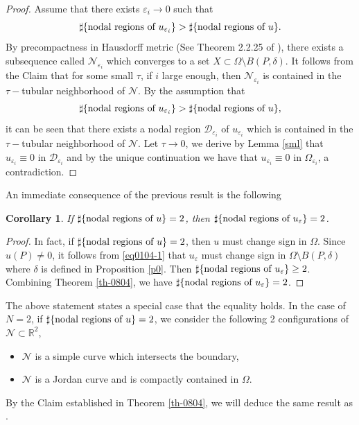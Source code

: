 \documentclass[11pt,reqno]{article}
\newtheorem{cor}[teo]{Corollary}
\numberwithin{equation}{section}
\newcommand\R{\mathbb R}
\newcommand\e\varepsilon
\renewcommand\O\Omega
\begin{document}
\begin{proof}
      Assume that there exists $\e_i\to 0$ such that
      $$
    \sharp\{\hbox{nodal regions of } u_{\e_i}\}> \sharp \{\hbox{nodal regions of } u\}.
    $$
     By precompactness in Hausdorff metric (See Theorem 2.2.25 of \cite{Henrot2018}), there exists a subsequence called $\mathcal{N}_{\e_i}$  which converges to a set $X\subset\O\setminus B(P,\delta)$. It follows from  the Claim  that  for some small $\tau$, if $i$ large enough,  then $\mathcal{N}_{\e_i}$ is contained in the $\tau-$tubular neighborhood of $\mathcal{N}$. By the assumption that  
     $$
    \sharp\{\hbox{nodal regions of } u_{\e_i}\}> \sharp \{\hbox{nodal regions of } u\},
    $$
    it can be seen that there exists a nodal region $\mathcal{D}_{\e_i}$ of $u_{\e_i}$  which is contained in the $\tau-$tubular neighborhood of $\mathcal{N}$. Let $\tau\to 0$, we derive by Lemma \ref{sml} that $u_{\e_i}\equiv 0$ in $\mathcal{D}_{\e_i}$ and by the unique continuation we have that $u_{\e_i}\equiv0$ in $\Omega_{\e_i}$, a contradiction.
   \end{proof}
    An immediate consequence of the previous result is the following
   \begin{cor}
 If $\sharp \{\hbox{nodal regions of } u\}=2$, then $\sharp \{\hbox{nodal regions of } u_\e\}= 2$.
   \end{cor}
    \begin{proof}
In fact,  if $\sharp \{\hbox{nodal regions of } u\}=2$, then $u$ must change sign in $\O$.  Since $u(P)\neq 0$, it follows from \eqref{eq0104-1} that $u_\e$ must change sign in $\O\setminus B(P,\delta)$ where $\delta$ is defined in Proposition \ref{p0}. Then $\sharp \{\hbox{nodal regions of } u_\e\}\ge 2$. Combining Theorem \ref{th-0804}, we have $\sharp \{\hbox{nodal regions of } u_\e\}= 2$.
   \end{proof}
   The above statement states a special case that the equality holds. In the case of $N=2$, if $\sharp \{\hbox{nodal regions of } u\}=2$, we consider the following 2 configurations of $\mathcal{N}\subset\R^2$,
   \begin{itemize}
       \item [(I)] $\mathcal{N}$ is a simple curve  which intersects the boundary,
       \item[(II)] $\mathcal{N}$ is a Jordan curve and is compactly contained in $\O$.
   \end{itemize}
   By the Claim  established in Theorem \ref{th-0804}, we will deduce the same result as \cite[Proposition 2.6, $N=2$]{MukherjeeSaha2025}.
\end{document}
